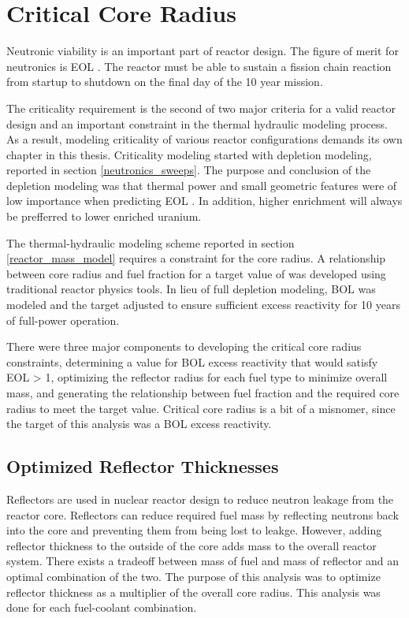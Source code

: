 \section{Critical Core Radius}

Neutronic viability is an important part of reactor design. The figure of merit
for neutronics is EOL \keff. The reactor must be able to sustain a fission
chain reaction from startup to shutdown on the final day of the 10 year mission.

The criticality requirement is the second of two major criteria for a valid reactor design and an
important constraint in the thermal hydraulic modeling process. As a result,
modeling criticality of various reactor configurations demands its own chapter
in this thesis. Criticality modeling started with depletion modeling, reported
in section \ref{neutronics_sweeps}. The purpose and conclusion of the depletion
modeling was that thermal power and small geometric features were of low
importance when predicting EOL \keff. In addition, higher enrichment will always
be prefferred to lower enriched uranium.

The thermal-hydraulic modeling scheme
reported in section \ref{reactor_mass_model} requires a constraint for the core
radius. A relationship between core radius and fuel fraction for a target
value of \keff was developed using traditional reactor physics tools. In lieu of
full depletion modeling, BOL \keff was modeled and the \keff target adjusted to
ensure sufficient excess reactivity for 10 years of full-power operation.

There were three major components to developing the critical core radius
constraints, determining a value for BOL excess reactivity that would satisfy
EOL \keff > 1, optimizing the reflector radius for each fuel type to minimize
overall mass, and generating the relationship between fuel fraction and the
required core radius to meet the target \keff value. Critical core radius is a
bit of a misnomer, since the target of this analysis was a BOL excess
reactivity.

\subsection{Optimized Reflector Thicknesses}
Reflectors are used in nuclear reactor design to reduce neutron leakage from the
reactor core. Reflectors can reduce required fuel mass by reflecting neutrons
back into the core and preventing them from being lost to leakge. However,
adding reflector thickness to the outside of the core adds mass to the overall
reactor system. There exists a tradeoff between mass of fuel and mass of
reflector and an optimal combination of the two. The purpose of this analysis
was to optimize reflector thickness as a multiplier of the overall core radius.
This analysis was done for each fuel-coolant combination.

